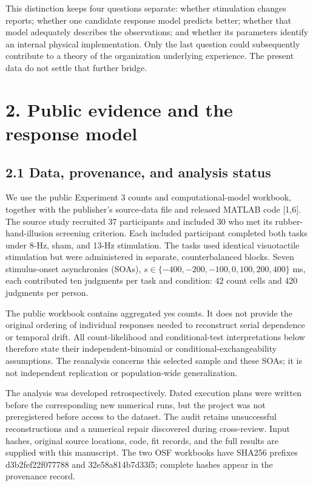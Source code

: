 \documentclass[
  11pt,
]{article}
\let\ctdoldsection\section
\renewcommand{\section}{\Needspace{8\baselineskip}\ctdoldsection}
\let\ctdoldsubsection\subsection
\renewcommand{\subsection}{\Needspace{6\baselineskip}\ctdoldsubsection}
\begin{document}
This distinction keeps four questions separate: whether stimulation
changes reports; whether one candidate response model predicts better;
whether that model adequately describes the observations; and whether
its parameters identify an internal physical implementation. Only the
last question could subsequently contribute to a theory of the
organization underlying experience. The present data do not settle that
further bridge.

\hypertarget{public-evidence-and-the-response-model}{%
\section{2. Public evidence and the response
model}\label{public-evidence-and-the-response-model}}

\hypertarget{data-provenance-and-analysis-status}{%
\subsection{2.1 Data, provenance, and analysis
status}\label{data-provenance-and-analysis-status}}

We use the public Experiment 3 counts and computational-model workbook,
together with the publisher's source-data file and released MATLAB code
{[}1,6{]}. The source study recruited 37 participants and included 30
who met its rubber-hand-illusion screening criterion. Each included
participant completed both tasks under 8-Hz, sham, and 13-Hz
stimulation. The tasks used identical visuotactile stimulation but were
administered in separate, counterbalanced blocks. Seven stimulus-onset
asynchronies (SOAs), \(s\in\{-400,-200,-100,0,100,200,400\}\) ms, each
contributed ten judgments per task and condition: 42 count cells and 420
judgments per person.

The public workbook contains aggregated yes counts. It does not provide
the original ordering of individual responses needed to reconstruct
serial dependence or temporal drift. All count-likelihood and
conditional-test interpretations below therefore state their
independent-binomial or conditional-exchangeability assumptions. The
reanalysis concerns this selected sample and these SOAs; it is not
independent replication or population-wide generalization.

The analysis was developed retrospectively. Dated execution plans were
written before the corresponding new numerical runs, but the project was
not preregistered before access to the dataset. The audit retains
unsuccessful reconstructions and a numerical repair discovered during
cross-review. Input hashes, original source locations, code, fit
records, and the full results are supplied with this manuscript. The two
OSF workbooks have SHA256 prefixes d3b2fef22f077788 and
32e58a814b7d33f5; complete hashes appear in the provenance record.
\end{document}
